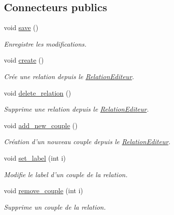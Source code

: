 \subsection*{Connecteurs publics}
\begin{DoxyCompactItemize}
\item 
\hypertarget{class_relation_editeur_a8c46b381f05903282a86411990058b3f}{void \hyperlink{class_relation_editeur_a8c46b381f05903282a86411990058b3f}{save} ()}\label{class_relation_editeur_a8c46b381f05903282a86411990058b3f}

\begin{DoxyCompactList}\small\item\em Enregistre les modifications. \end{DoxyCompactList}\item 
\hypertarget{class_relation_editeur_a0d760d64345d96a887b3002839b79528}{void \hyperlink{class_relation_editeur_a0d760d64345d96a887b3002839b79528}{create} ()}\label{class_relation_editeur_a0d760d64345d96a887b3002839b79528}

\begin{DoxyCompactList}\small\item\em Crée une relation depuis le \hyperlink{class_relation_editeur}{Relation\-Editeur}. \end{DoxyCompactList}\item 
\hypertarget{class_relation_editeur_a4b7de6390f8006db0b0f5b9f50e90ed6}{void \hyperlink{class_relation_editeur_a4b7de6390f8006db0b0f5b9f50e90ed6}{delete\-\_\-relation} ()}\label{class_relation_editeur_a4b7de6390f8006db0b0f5b9f50e90ed6}

\begin{DoxyCompactList}\small\item\em Supprime une relation depuis le \hyperlink{class_relation_editeur}{Relation\-Editeur}. \end{DoxyCompactList}\item 
\hypertarget{class_relation_editeur_aa94f1bdb568c4d7765bead126581e195}{void \hyperlink{class_relation_editeur_aa94f1bdb568c4d7765bead126581e195}{add\-\_\-new\-\_\-couple} ()}\label{class_relation_editeur_aa94f1bdb568c4d7765bead126581e195}

\begin{DoxyCompactList}\small\item\em Création d'un nouveau couple depuis le \hyperlink{class_relation_editeur}{Relation\-Editeur}. \end{DoxyCompactList}\item 
void \hyperlink{class_relation_editeur_a06db7a2ef1338a2aee64c05f4711578c}{set\-\_\-label} (int i)
\begin{DoxyCompactList}\small\item\em Modifie le label d'un couple de la relation. \end{DoxyCompactList}\item 
void \hyperlink{class_relation_editeur_a8af114d6d5e36e71d8ae3f6685ce746a}{remove\-\_\-couple} (int i)
\begin{DoxyCompactList}\small\item\em Supprime un couple de la relation. \end{DoxyCompactList}\end{DoxyCompactItemize}
